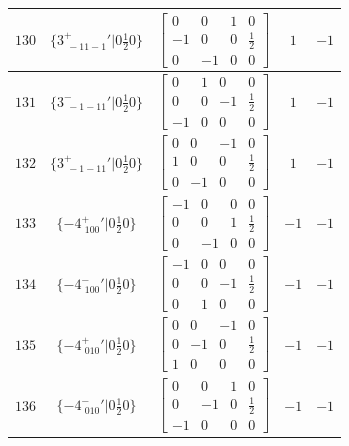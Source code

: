 \documentclass[fleqn,8pt]{jsarticle}
\begin{document}
\begin{longtable}{ccccc}
$ 130 $ & $ \{3^{+}_{\,\,-11-1}{}'|0 \frac{1}{2} 0\} $ & $ \begin{bmatrix} 0 & 0 & 1 & 0 \\ -1 & 0 & 0 & \frac{1}{2} \\ 0 & -1 & 0 & 0 \end{bmatrix} $ & $ 1 $ & $ -1 $ \\ \hline
$ 131 $ & $ \{3^{-}_{\,\,-1-11}{}'|0 \frac{1}{2} 0\} $ & $ \begin{bmatrix} 0 & 1 & 0 & 0 \\ 0 & 0 & -1 & \frac{1}{2} \\ -1 & 0 & 0 & 0 \end{bmatrix} $ & $ 1 $ & $ -1 $ \\ \hline
$ 132 $ & $ \{3^{+}_{\,\,-1-11}{}'|0 \frac{1}{2} 0\} $ & $ \begin{bmatrix} 0 & 0 & -1 & 0 \\ 1 & 0 & 0 & \frac{1}{2} \\ 0 & -1 & 0 & 0 \end{bmatrix} $ & $ 1 $ & $ -1 $ \\ \hline
$ 133 $ & $ \{-4^{+}_{\,\,100}{}'|0 \frac{1}{2} 0\} $ & $ \begin{bmatrix} -1 & 0 & 0 & 0 \\ 0 & 0 & 1 & \frac{1}{2} \\ 0 & -1 & 0 & 0 \end{bmatrix} $ & $ -1 $ & $ -1 $ \\ \hline
$ 134 $ & $ \{-4^{-}_{\,\,100}{}'|0 \frac{1}{2} 0\} $ & $ \begin{bmatrix} -1 & 0 & 0 & 0 \\ 0 & 0 & -1 & \frac{1}{2} \\ 0 & 1 & 0 & 0 \end{bmatrix} $ & $ -1 $ & $ -1 $ \\ \hline
$ 135 $ & $ \{-4^{+}_{\,\,010}{}'|0 \frac{1}{2} 0\} $ & $ \begin{bmatrix} 0 & 0 & -1 & 0 \\ 0 & -1 & 0 & \frac{1}{2} \\ 1 & 0 & 0 & 0 \end{bmatrix} $ & $ -1 $ & $ -1 $ \\ \hline
$ 136 $ & $ \{-4^{-}_{\,\,010}{}'|0 \frac{1}{2} 0\} $ & $ \begin{bmatrix} 0 & 0 & 1 & 0 \\ 0 & -1 & 0 & \frac{1}{2} \\ -1 & 0 & 0 & 0 \end{bmatrix} $ & $ -1 $ & $ -1 $ \\ \hline

\end{longtable}
\end{document}
